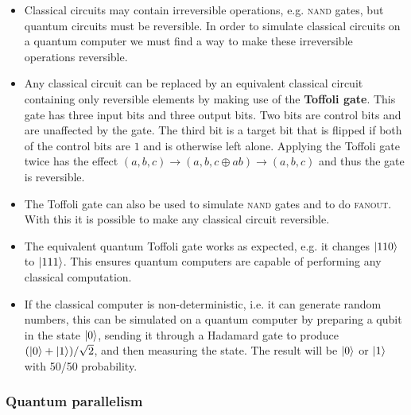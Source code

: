 \documentclass{article}
\begin{document}
\begin{itemize}
  \item Classical circuits may contain irreversible operations, e.g. \textsc{nand} gates, but quantum circuits must be reversible. In order to simulate classical circuits on a quantum computer we must find a way to make these irreversible operations reversible.

  \item Any classical circuit can be replaced by an equivalent classical circuit containing only reversible elements by making use of the \textbf{Toffoli gate}. This gate has three input bits and three output bits. Two bits are control bits and are unaffected by the gate. The third bit is a target bit that is flipped if both of the control bits are $1$ and is otherwise left alone. Applying the Toffoli gate twice has the effect $(a, b, c) \rightarrow (a, b, c \oplus a b) \rightarrow (a, b, c)$ and thus the gate is reversible.

  \item The Toffoli gate can also be used to simulate \textsc{nand} gates and to do \textsc{fanout}. With this it is possible to make any classical circuit reversible.

  \item The equivalent quantum Toffoli gate works as expected, e.g. it changes $\ket{1 1 0}$ to $\ket{1 1 1}$. This ensures quantum computers are capable of performing any classical computation.

  \item If the classical computer is non-deterministic, i.e. it can generate random numbers, this can be simulated on a quantum computer by preparing a qubit in the state $\ket{0}$, sending it through a Hadamard gate to produce $(\ket{0} + \ket{1}) / \sqrt{2}$, and then measuring the state. The result will be $\ket{0}$ or $\ket{1}$ with 50/50 probability.
\end{itemize}

\subsubsection{Quantum parallelism}
\end{document}
